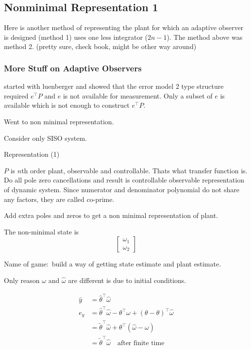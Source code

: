 \subsection{Nonminimal Representation 1}

Here is another method of representing the plant for which an adaptive observer is designed (method 1) uses one less integrator ($2n-1$).
The method above was method 2.
(pretty sure, check book, might be other way around)

\subsubsection{More Stuff on Adaptive Observers}

started with luenberger and showed that the error model 2 type structure required $e^{\top}P$ and $e$ is not available for measurement.
Only a subset of $e$ is available which is not enough to construct $e^{\top}P$.

Went to non minimal representation.

Consider only SISO system.

Representation (1)

$P$ is $n$th order plant, observable and controllable.
Thats what transfer function is.
Do all pole zero cancellations and result is controllable observable representation of dynamic system.
Since numerator and denominator polynomial do not share any factors, they are called co-prime.

Add extra poles and zeros to get a non minimal representation of plant.


The non-minimal state is
\begin{equation*}
  \begin{bmatrix}
    \omega_{1} \\
    \omega_{2}
  \end{bmatrix}
\end{equation*}

Name of game:\ build a way of getting state estimate and plant estimate.

Only reason $\omega$ and $\hat{\omega}$ are different is due to initial conditions.

\begin{align*}
  \hat{y}&=\hat{\theta}^{\top}\hat{\omega} \\
  e_{y}&=\hat{\theta}^{\top}\hat{\omega}-\theta^{\top}\omega+(\theta-\theta)^{\top}\hat{\omega} \\
  &=\tilde{\theta}^{\top}\hat{\omega}+\theta^{\top}(\hat{\omega}-\omega) \\
  &=\tilde{\theta}^{\top}\hat{\omega}\quad\text{after finite time}
\end{align*}

